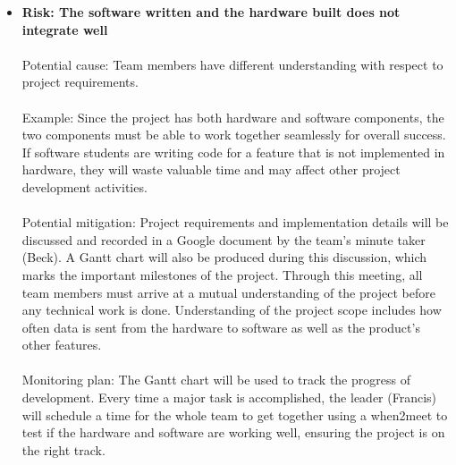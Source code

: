 \begin{itemize}
\item\textbf{Risk: The software written and the hardware built does not integrate well}
\\
\\ Potential cause: Team members have different understanding with respect to project requirements.
\\
\\ Example: Since the project has both hardware and software components, the two components must be able to work together seamlessly for overall success. If software students are writing code for a feature that is not implemented in hardware, they will waste valuable time and may affect other project development activities.
\\
\\ Potential mitigation: Project requirements and implementation details will be discussed and recorded in a Google document by the team’s minute taker (Beck). A Gantt chart will also be produced during this discussion, which marks the important milestones of the project. Through this meeting, all team members must arrive at a mutual understanding of the project before any technical work is done. Understanding of the project scope includes how often data is sent from the hardware to software as well as the product’s other features.
\\
\\ Monitoring plan: The Gantt chart will be used to track the progress of development. Every time a major task is accomplished, the leader (Francis) will schedule a time for the whole team to get together using a when2meet to test if the hardware and software are working well, ensuring the project is on the right track.
\\
\\


\end{itemize}
